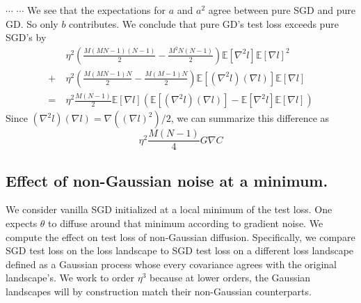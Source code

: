 \documentclass[openany, notitlepage, justified]{tufte-book}
\theoremstyle{plain}
\theoremstyle{definition}
\newcommand{\wrap}[1]{\left(#1\right)}
\newcommand{\expct}[1]{\mathbb{E}\left[#1\right]}
\begin{document}
\begin{shaded}
                $\cdots$
                $\cdots$ We see that the expectations for $a$ and $a^2$ agree
                between pure SGD and pure GD.  So only $b$ contributes.  We
                conclude that pure GD's test loss exceeds pure SGD's by
                \begin{align*}
                       ~&\eta^2
                        \wrap{\frac{M(MN-1)(N-1)}{2}  - \frac{M^2N(N-1)}{2}}
                        \expct{\nabla^2 l} \expct{\nabla l}^2 \\
                    +   ~&\eta^2 
                        \wrap{\frac{M(MN-1)N}{2} - \frac{M(M-1)N}{2}}
                        \expct{(\nabla^2 l) (\nabla l)} \expct{\nabla l} \\
                    = 
                        ~&\eta^2     \frac{M(N-1)}{2}
                    \expct{\nabla l} \wrap{
                          \expct{(\nabla^2 l) (\nabla l)}
                        - \expct{\nabla^2 l} \expct{\nabla l}
                    }
                \end{align*}
                Since $(\nabla^2 l) (\nabla l) = \nabla((\nabla l)^2)/2$, we can 
                summarize this difference as
                $$
                    \eta^2 \frac{M(N-1)}{4}
                    G \nabla C 
                $$
            \end{shaded}

        \newpage
        \subsection{Effect of non-Gaussian noise at a minimum.}
            We consider vanilla SGD initialized at a local minimum of the test loss.
            One expects $\theta$ to diffuse around that minimum according to
            gradient noise.  We compute the effect on test loss of non-Gaussian
            diffusion.  Specifically, we compare SGD test loss on the loss
            landscape to SGD test loss on a different loss landscape defined as a
            Gaussian process whose every covariance agrees with the original
            landscape's.  We work to order $\eta^3$ because at lower orders,
            the Gaussian landscapes will by construction match their non-Gaussian
            counterparts.
\end{document}
